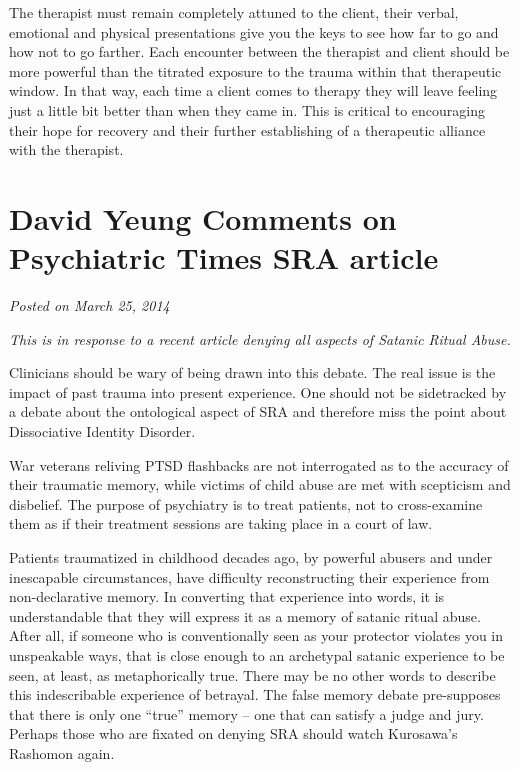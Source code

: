 \documentclass[]{book}
\begin{document}
The therapist must remain completely attuned to the client, their verbal, emotional and physical presentations give you the keys to see how far to go and how not to go farther. Each encounter between the therapist and client should be more powerful than the titrated exposure to the trauma within that therapeutic window. In that way, each time a client comes to therapy they will leave feeling just a little bit better than when they came in. This is critical to encouraging their hope for recovery and their further establishing of a therapeutic alliance with the therapist.

\hypertarget{david-yeung-comments-on-psychiatric-times-sra-article}{%
\section{David Yeung Comments on Psychiatric Times SRA article}\label{david-yeung-comments-on-psychiatric-times-sra-article}}

\emph{Posted on March 25, 2014}

\emph{This is in response to a recent article denying all aspects of Satanic Ritual Abuse.}

Clinicians should be wary of being drawn into this debate. The real issue is the impact of past trauma into present experience. One should not be sidetracked by a debate about the ontological aspect of SRA and therefore miss the point about Dissociative Identity Disorder.

War veterans reliving PTSD flashbacks are not interrogated as to the accuracy of their traumatic memory, while victims of child abuse are met with scepticism and disbelief. The purpose of psychiatry is to treat patients, not to cross-examine them as if their treatment sessions are taking place in a court of law.

Patients traumatized in childhood decades ago, by powerful abusers and under inescapable circumstances, have difficulty reconstructing their experience from non-declarative memory. In converting that experience into words, it is understandable that they will express it as a memory of satanic ritual abuse. After all, if someone who is conventionally seen as your protector violates you in unspeakable ways, that is close enough to an archetypal satanic experience to be seen, at least, as metaphorically true. There may be no other words to describe this indescribable experience of betrayal. The false memory debate pre-supposes that there is only one ``true'' memory -- one that can satisfy a judge and jury. Perhaps those who are fixated on denying SRA should watch Kurosawa's Rashomon again.
\end{document}
